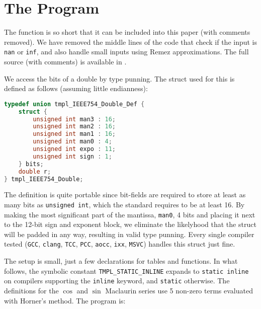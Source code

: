 \documentclass{article}
\theoremstyle{plain}
\begin{document}
    \section{The Program}
        The function is so short that it can be included into this paper
        (with comments removed). We have removed the middle lines of the
        code that check if the input is \texttt{nan} or \texttt{inf},
        and also handle small inputs using Remez approximations.
        The full source (with comments) is available in \cite{MaguireLibtmpl}.
        \par\hfill\par
        We access the bits of a double by type punning. The struct used for
        this is defined as follows (assuming little endianness):
        \begin{mdframed}
            \begin{lstlisting}[language={C}]
typedef union tmpl_IEEE754_Double_Def {
    struct {
        unsigned int man3 : 16;
        unsigned int man2 : 16;
        unsigned int man1 : 16;
        unsigned int man0 : 4;
        unsigned int expo : 11;
        unsigned int sign : 1;
    } bits;
    double r;
} tmpl_IEEE754_Double;
            \end{lstlisting}
        \end{mdframed}
        The definition is quite portable since bit-fields are required to
        store at least as many bits as \texttt{unsigned int}, which the
        standard requires to be at least 16. By making the most significant
        part of the mantissa, \texttt{man0}, 4 bits and placing it next to the
        12-bit sign and exponent block, we eliminate the likelyhood that
        the struct will be padded in any way, resulting in valid type punning.
        Every single compiler tested (\texttt{GCC}, \texttt{clang},
        \texttt{TCC}, \texttt{PCC}, \texttt{aocc}, \texttt{ixx}, \texttt{MSVC})
        handles this struct just fine.
        \par\hfill\par
        The setup is small, just a few declarations for tables and functions.
        In what follows, the symbolic constant \texttt{TMPL\_STATIC\_INLINE}
        expands to \texttt{static inline} on compilers supporting the
        \texttt{inline} keyword, and \texttt{static} otherwise. The
        definitions for the $\cos$ and $\sin$ Maclaurin series use
        5 non-zero terms evaluated with Horner's method. The program is:
        \newpage
\end{document}
